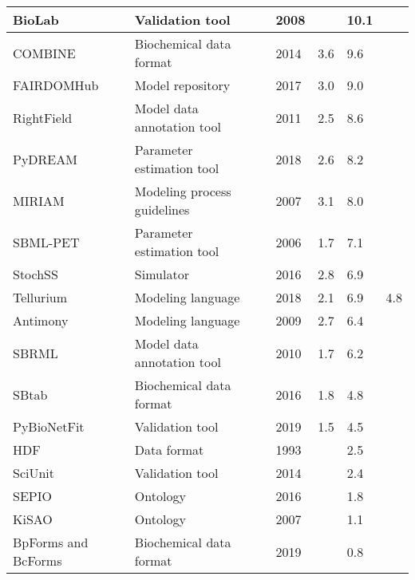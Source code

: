 \begin{longtable}{L{2.2cm}L{4cm}L{1cm}L{0.8cm}R{1.1cm}R{1cm}R{1cm}}
\midrule
\small{BioLab} &\small{Validation tool} &\cite{Clarke2008StatisticalPathway} &\small{2008} &\small{} &\small{10.1} &\small{}\\
\midrule
\small{COMBINE} &\small{Biochemical data format} &\cite{Bergmann2014COMBINEProject} &\small{2014} &\small{3.6} &\small{9.6} &\small{}\\
\midrule
\small{FAIRDOMHub} &\small{Model repository} &\cite{Wolstencroft2017FAIRDOMHub:Research.} &\small{2017} &\small{3.0} &\small{9.0} &\small{}\\
\midrule
\small{RightField} &\small{Model data annotation tool} &\cite{Wolstencroft2011RightField:Spreadsheets} &\small{2011} &\small{2.5} &\small{8.6} &\small{}\\
\midrule
\small{PyDREAM} &\small{Parameter estimation tool} &\cite{Shockley2018PyDREAM:Python} &\small{2018} &\small{2.6} &\small{8.2} &\small{}\\
\midrule
\small{MIRIAM} &\small{Modeling process guidelines} &\cite{Laibe2007MIRIAMBiology.} &\small{2007} &\small{3.1} &\small{8.0} &\small{}\\
\midrule
\small{SBML-PET} &\small{Parameter estimation tool} &\cite{Zi2006SBML-PET:Tool} &\small{2006} &\small{1.7} &\small{7.1} &\small{}\\
\midrule
\small{StochSS} &\small{Simulator} &\cite{drawert2016stochastic} &\small{2016} &\small{2.8} &\small{6.9} &\small{}\\
\midrule
\small{Tellurium} &\small{Modeling language} &\cite{Choi2018Tellurium:Biology} &\small{2018} &\small{2.1} &\small{6.9} &\small{4.8}\\
\midrule
\small{Antimony} &\small{Modeling language} &\cite{Smith2009Antimony:Language} &\small{2009} &\small{2.7} &\small{6.4} &\small{}\\
\midrule
\small{SBRML} &\small{Model data annotation tool} &\cite{Dada2010SBRML:Models} &\small{2010} &\small{1.7} &\small{6.2} &\small{}\\
\midrule
\small{SBtab} &\small{Biochemical data format} &\cite{Lubitz2016SBtab:Biology} &\small{2016} &\small{1.8} &\small{4.8} &\small{}\\
\midrule
\small{PyBioNetFit} &\small{Validation tool} &\cite{Mitra2019PyBioNetFitLanguage} &\small{2019} &\small{1.5} &\small{4.5} &\small{}\\
\midrule
\small{HDF} &\small{Data format} &\cite{Brown1993SoftwareManagement} &\small{1993} &\small{} &\small{2.5} &\small{}\\
\midrule
\small{SciUnit} &\small{Validation tool} &\cite{Omar2014CollaborativeValidation} &\small{2014} &\small{} &\small{2.4} &\small{}\\
\midrule
\small{SEPIO} &\small{Ontology} &\cite{Brush2016SEPIO:Evidence} &\small{2016} &\small{} &\small{1.8} &\small{}\\
\midrule
\small{KiSAO} &\small{Ontology} &\cite{Zhukova2011KineticOntology} &\small{2007} &\small{} &\small{1.1} &\small{}\\
\midrule
\small{BpForms and BcForms} &\small{Biochemical data format} &\cite{Lang2019BpForms:Proteins} &\small{2019} &\small{} &\small{0.8} &\small{}\\
\bottomrule\end{longtable}
